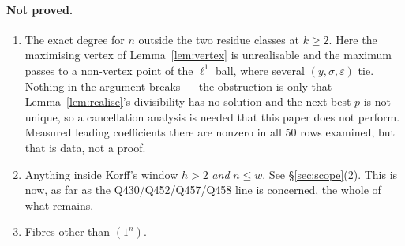 \documentclass[11pt]{article}
\theoremstyle{plain}
\theoremstyle{definition}
\theoremstyle{remark}
\newcommand{\onen}{(1^{n})}
\begin{document}
\paragraph{Not proved.}
\begin{enumerate}
\item The exact degree for $n$ outside the two residue classes at $k\ge2$. Here the
maximising vertex of Lemma~\ref{lem:vertex} is unrealisable and the maximum passes to a
non-vertex point of the $\ell^1$ ball, where several $(y,\sigma,\varepsilon)$ tie. Nothing
in the argument breaks --- the obstruction is only that Lemma~\ref{lem:realise}'s
divisibility has no solution and the next-best $p$ is not unique, so a cancellation
analysis is needed that this paper does not perform. Measured leading coefficients there
are nonzero in all 50 rows examined, but that is data, not a proof.
\item Anything inside Korff's window $h>2$ \emph{and} $n\le w$. See \S\ref{sec:scope}(2).
This is now, as far as the Q430/Q452/Q457/Q458 line is concerned, the whole of what
remains.
\item Fibres other than $\onen$.
\end{enumerate}
\end{document}
